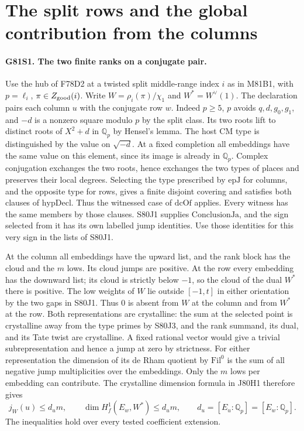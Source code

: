 \section{The split rows and the global contribution from the columns}

\paragraph{G81S1. The two finite ranks on a conjugate pair.}
Use the hub of F78D2 at a twisted split middle-range index $i$ as in
M81B1, with $p=\ell_i$, $\pi\in Z_{\rm good}(i)$. Write
$W=\rho_i(\pi)/\chi_1$ and $W^*=W^\vee(1)$. The declaration
pairs each column $u$ with the conjugate row $w$. Indeed $p\ge5$,
$p$ avoids $q,d,g_0,g_1$, and $-d$ is a nonzero square modulo $p$ by
the split class. Its two roots lift to distinct roots of $X^2+d$
in $\mathbb Q_p$ by Hensel's lemma. The host CM type is distinguished
by the value on $\sqrt{-d}$. At a fixed completion all embeddings
have the same value on this element, since its image is already in
$\mathbb Q_p$. Complex conjugation exchanges the two roots, hence
exchanges the two types of places and preserves their local degrees.
Selecting the type prescribed by $\mathrm{epJ}$ for columns, and
the opposite type for rows, gives a finite disjoint covering and
satisfies both clauses of $\mathrm{hypDecl}$. Thus the witnessed
case of $\mathrm{dcOf}$ applies. Every witness has the same members
by those clauses. S80J1 supplies $\mathrm{ConclusionJa}$, and
the sign selected from it has its own labelled jump identities.
Use those identities for this very sign in the lists of S80J1.

At the column all embeddings have the upward list, and the rank
block has the cloud and the $m$ lows. Its cloud jumps are positive.
At the row every embedding has the downward list; its cloud is
strictly below $-1$, so the cloud of the dual $W^*$ there is
positive. The low weights of $W$ lie outside $[-1,t]$ in either
orientation by the two gaps in S80J1. Thus $0$ is absent from
$W$ at the column and from $W^*$ at the row. Both representations
are crystalline: the sum at the selected point is crystalline
away from the type primes by S80J3, and the rank summand, its
dual, and its Tate twist are crystalline. A fixed rational
vector would give a trivial subrepresentation and hence a jump
at zero by strictness. For either representation the dimension
of its de Rham quotient by $\mathrm{Fil}^0$ is the sum of all
negative jump multiplicities over the embeddings. Only the $m$
lows per embedding can contribute. The crystalline dimension
formula in J80H1 therefore gives
\[
       j_W(u)\le d_um,\qquad
       \dim H^1_f(E_w,W^*)\le d_um,\qquad
       d_u=[E_u:\mathbb Q_p]=[E_w:\mathbb Q_p].
\]
The inequalities hold over every tested coefficient extension.


